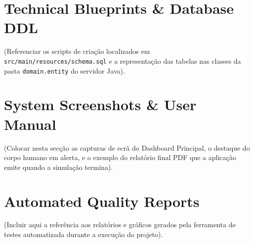 \documentclass[11pt,a4paper]{article}
\begin{document}
\appendix
\section{Technical Blueprints \& Database DDL}
(Referenciar os scripts de criação localizados em \texttt{src/main/resources/schema.sql} e a representação das tabelas nas classes da pasta \texttt{domain.entity} do servidor Java).

\section{System Screenshots \& User Manual}
(Colocar nesta secção as capturas de ecrã do Dashboard Principal, o destaque do corpo humano em alerta, e o exemplo do relatório final PDF que a aplicação emite quando a simulação termina).

\section{Automated Quality Reports}
(Incluir aqui a referência aos relatórios e gráficos gerados pela ferramenta de testes automatizada durante a execução do projeto).
\end{document}
